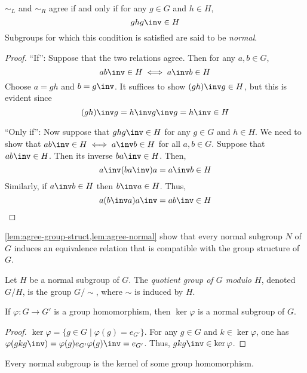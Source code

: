 \documentclass{amsart}
\begin{document}
\begin{lem}\label{lem:agree-normal}
  $\sim_{L}$ and $\sim_{R}$ agree if and only if for any $g \in G$ and $h \in H$,
  \[
    ghg\inv \in H
  \]
  Subgroups for which this condition is satisfied are said to be \emph{normal}.
\end{lem}
\begin{proof}
  ``If'': Suppose that the two relations agree.
  Then for any $a,b \in G$,
  \[
    ab\inv \in H \iff a\inv b \in H
  \]
  Choose $a = gh$ and $b = g\inv$.
  It suffices to show $(gh)\inv g \in H$, but this is evident since
  \[
    (gh)\inv g = h\inv g\inv g = h\inv \in H
  \]

  ``Only if'': Now suppose that $ghg\inv \in H$ for any $g \in G$ and $h \in H$.
  We need to show that $ab\inv \in H \iff a\inv b \in H$ for all $a, b \in G$.
  Suppose that $ab\inv \in H$.
  Then its inverse $ba\inv \in H$.
  Then,
  \[
    a\inv(ba\inv)a = a\inv b \in H
  \]
  Similarly, if $a\inv b \in H$ then $b\inv a \in H$.
  Thus,
  \[
    a(b\inv a)a\inv = ab\inv \in H
  \]
\end{proof}

\cref{lem:agree-group-struct,lem:agree-normal} show that every normal subgroup $N$ of $G$ induces an equivalence relation that is compatible with the group structure of $G$.

\begin{defn}
  Let $H$ be a normal subgroup of $G$.
  The \emph{quotient group of $G$ modulo $H$}, denoted $G/H$, is the group $G/\sim$, where $\sim$ is induced by $H$.
\end{defn}

\begin{lem}
  If $\varphi : G \to G'$ is a group homomorphism, then $\ker{\varphi}$ is a normal subgroup of $G$.
\end{lem}
\begin{proof}
  $\ker{\varphi} = \{g \in G \mid \varphi(g) = e_{G'}\}$.
  For any $g \in G$ and $k \in \ker{\varphi}$, one has $\varphi(gkg\inv) = \varphi(g)e_{G'}\varphi(g)\inv = e_{G'}$.
  Thus, $gkg\inv \in \ker{\varphi}$.
\end{proof}


\begin{lem}
  Every normal subgroup is the kernel of some group homomorphism.
\end{lem}
\end{document}
